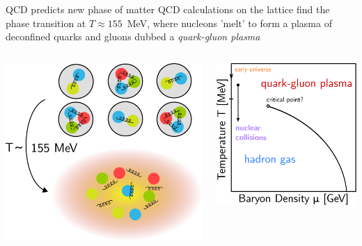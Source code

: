 \documentclass[xcolor=dvipsnames, aspectratio=169]{beamer}
\begin{document}
\begin{frame}[t]{QCD predicts new phase of matter}
    \bigskip
    QCD calculations on the lattice find the phase transition at $T \approx 155$~MeV, where nucleons 'melt' to form a plasma of deconfined quarks and gluons dubbed a \emph{quark-gluon plasma}\\[2ex]
    \begin{columns}
        \begin{column}{0.47\textwidth}
            \includegraphics[width=0.8\columnwidth]{confined_deconfined}
        \end{column}
        \begin{column}{0.4\textwidth}
            \includegraphics[width=0.8\columnwidth]{phasediagram}
        \end{column}
    \end{columns}
\end{frame}
\end{document}
